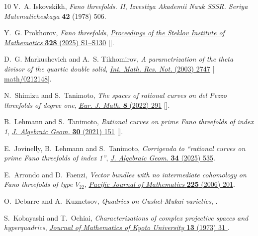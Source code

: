 \documentclass[11pt]{amsart}
\theoremstyle{definition}
\theoremstyle{definition}
\theoremstyle{remark}
\theoremstyle{remark}
\theoremstyle{definition}
\theoremstyle{conjecture}
\begin{document}
\begin{thebibliography}{10}
V.~A. Iskovskikh, \emph{{F}ano threefolds. {II}}, {\emph{Izvestiya Akademii
  Nauk SSSR. Seriya Matematicheskaya} {\bfseries 42} (1978) 506}.

Y.~G. Prokhorov, \emph{{F}ano threefolds},
  \href{https://doi.org/10.1134/s0081543825020014}{\emph{Proceedings of the
  Steklov Institute of Mathematics} {\bfseries 328} (2025) S1{--}S130}
  [\href{https://arxiv.org/abs/2511.22197}{{}}].

D.~G. Markushevich and A.~S. Tikhomirov, \emph{A parametrization of the theta
  divisor of the quartic double solid},
  \href{https://doi.org/10.1155/S1073792803212174}{\emph{Int. Math. Res. Not.}
  (2003) 2747} [\href{https://arxiv.org/abs/math/0212148}{{\ttfamily
  math/0212148}}].

N.~Shimizu and S.~Tanimoto, \emph{The spaces of rational curves on del {P}ezzo
  threefolds of degree one},
  \href{https://doi.org/10.1007/s40879-021-00516-2}{\emph{Eur. J. Math.}
  {\bfseries 8} (2022) 291} [\href{https://arxiv.org/abs/2101.04312}{{}}].

B.~Lehmann and S.~Tanimoto, \emph{Rational curves on prime {F}ano threefolds of
  index 1}, \href{https://doi.org/10.1090/jag/751}{\emph{J. Algebraic Geom.}
  {\bfseries 30} (2021) 151}
  [\href{https://arxiv.org/abs/1808.05590}{{}}].

E.~Jovinelly, B.~Lehmann and S.~Tanimoto, \emph{Corrigenda to ``rational curves
  on prime {F}ano threefolds of index 1''},
  \href{https://doi.org/10.1090/jag/841}{\emph{J. Algebraic Geom.} {\bfseries
  34} (2025) 535}.

E.~Arrondo and D.~Faenzi, \emph{Vector bundles with no intermediate cohomology
  on {F}ano threefolds of type {$V_{22}$}},
  \href{https://doi.org/10.2140/pjm.2006.225.201}{\emph{Pacific Journal of
  Mathematics} {\bfseries 225} (2006) 201}.

O.~Debarre and A.~Kuznetsov, \emph{Quadrics on {G}ushel-{M}ukai varieties},
  \href{https://arxiv.org/abs/2409.03528}{{}}.

S.~Kobayashi and T.~Ochiai, \emph{{Characterizations of complex projective
  spaces and hyperquadrics}},
  \href{https://doi.org/10.1215/kjm/1250523432}{\emph{Journal of Mathematics of
  Kyoto University} {\bfseries 13} (1973) 31 }.


\end{thebibliography}
\end{document}
